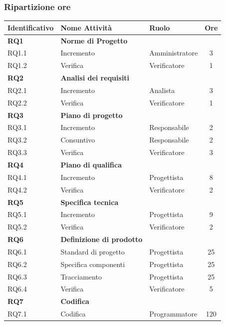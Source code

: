 \subsubsection{Ripartizione ore}
\bgroup
\begin{longtable}{|l|l|l|c|}
	\endfirsthead
	\hline
	\textbf{Identificativo} &
	\textbf{Nome Attività} &
	\textbf{Ruolo} &
	\textbf{Ore}\\
	\endhead
	\hline
	\textbf{RQ1} & \textbf{Norme di Progetto} &  &  \\
	\hline
	{RQ1.1} & {Incremento} & Amministratore  & 3\\
	\hline
	{RQ1.2} & {Verifica} & Verificatore & 1 \\
	\hline
	\textbf{RQ2} & \textbf{Analisi dei requisiti}  & & \\
	\hline
	{RQ2.1} & {Incremento} & Analista &  3\\
	\hline
	{RQ2.2} & {Verifica} & Verificatore & 1 \\
	\hline
	\textbf{RQ3} & \textbf{Piano di progetto} & &  \\
	\hline
	{RQ3.1} & {Incremento} & Responsabile  &  2\\
	\hline
	{RQ3.2} & {Consuntivo} & Responsabile  &  2\\
	\hline
	{RQ3.3} & {Verifica} & Verificatore  &  3\\
	\hline
	\textbf{RQ4} & \textbf{Piano di qualifica} & &  \\
	\hline
	{RQ4.1} & {Incremento} & Progettista  & 8\\
	\hline
	{RQ4.2} & {Verifica} & Verificatore & 2 \\
	\hline
	\textbf{RQ5} & \textbf{Specifica tecnica} & &  \\
	\hline
	{RQ5.1} & {Incremento} & Progettista  & 9\\
	\hline
	{RQ5.2} & {Verifica} & Verificatore & 2 \\
	\hline
	\textbf{RQ6} & \textbf{Definizione di prodotto} & &  \\
	\hline
	{RQ6.1} & {Standard di progetto} & Progettista  & 25\\
	\hline
	{RQ6.2} & {Specifica componenti} & Progettista & 25 \\
	\hline
	{RQ6.3} & {Tracciamento} & Progettista & 25 \\
	\hline
	{RQ6.4} & {Verifica} & Verificatore & 5 \\
	\hline
	\textbf{RQ7} & \textbf{Codifica} & &  \\
	\hline
	{RQ7.1} & {Codifica} & Programmatore  & 120\\

\end{longtable}
